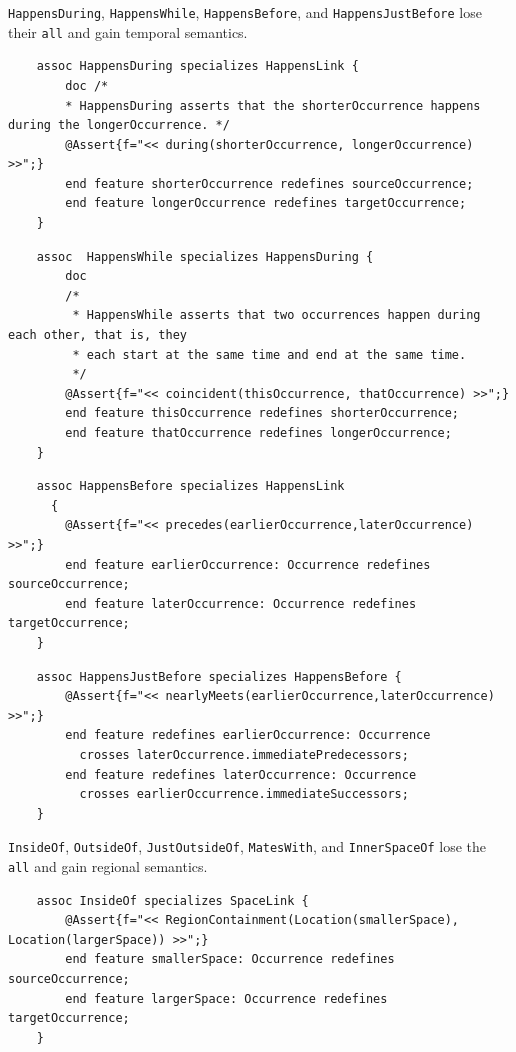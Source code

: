 \pn \texttt{HappensDuring}, \texttt{HappensWhile}, \texttt{HappensBefore}, and \texttt{HappensJustBefore} lose their  \texttt{all} and gain temporal semantics.

\begin{lstlisting}
	assoc HappensDuring specializes HappensLink {
		doc /*
		* HappensDuring asserts that the shorterOccurrence happens during the longerOccurrence. */
		@Assert{f="<< during(shorterOccurrence, longerOccurrence) >>";}
		end feature shorterOccurrence redefines sourceOccurrence;  
		end feature longerOccurrence redefines targetOccurrence;
	}
\end{lstlisting}

\begin{lstlisting}
	assoc  HappensWhile specializes HappensDuring {
		doc
		/*
		 * HappensWhile asserts that two occurrences happen during each other, that is, they
		 * each start at the same time and end at the same time.
		 */
		@Assert{f="<< coincident(thisOccurrence, thatOccurrence) >>";}
		end feature thisOccurrence redefines shorterOccurrence;
		end feature thatOccurrence redefines longerOccurrence;
	}
\end{lstlisting}

\begin{lstlisting}
	assoc HappensBefore specializes HappensLink 
	  {
		@Assert{f="<< precedes(earlierOccurrence,laterOccurrence) >>";}
		end feature earlierOccurrence: Occurrence redefines sourceOccurrence; 
		end feature laterOccurrence: Occurrence redefines targetOccurrence; 
	}
\end{lstlisting}

\begin{lstlisting}
	assoc HappensJustBefore specializes HappensBefore {
		@Assert{f="<< nearlyMeets(earlierOccurrence,laterOccurrence) >>";}
		end feature redefines earlierOccurrence: Occurrence
		  crosses laterOccurrence.immediatePredecessors;
		end feature redefines laterOccurrence: Occurrence
		  crosses earlierOccurrence.immediateSuccessors;
	}
\end{lstlisting}

\pn \texttt{InsideOf}, \texttt{OutsideOf}, \texttt{JustOutsideOf}, \texttt{MatesWith}, and \texttt{InnerSpaceOf} 
lose the \texttt{all} and gain regional semantics.

\begin{lstlisting}
	assoc InsideOf specializes SpaceLink {
		@Assert{f="<< RegionContainment(Location(smallerSpace), Location(largerSpace)) >>";}
		end feature smallerSpace: Occurrence redefines sourceOccurrence;  
		end feature largerSpace: Occurrence redefines targetOccurrence;
	}
\end{lstlisting}

